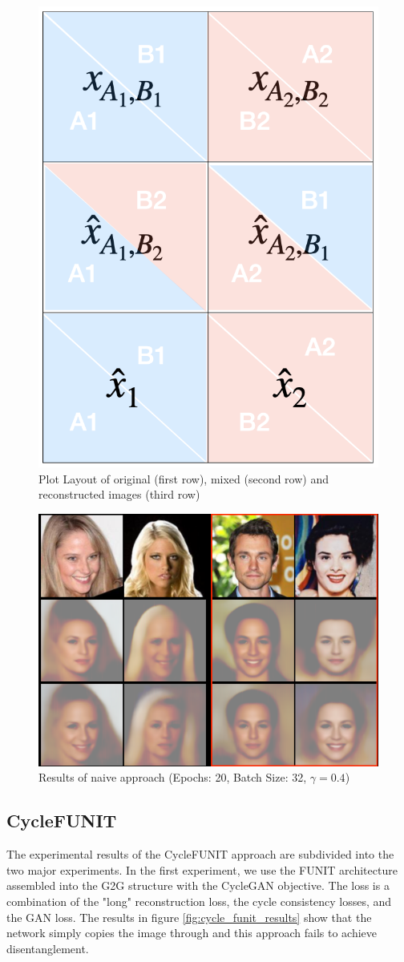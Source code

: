 \documentclass[conference]{IEEEtran}
\begin{document}
\begin{figure}[h!]
	\centering
	\includegraphics[width=0.5\linewidth]{figures/layout.png}
	\caption{Plot Layout of original (first row), mixed (second row) and reconstructed images (third row)}
	\label{fig:plot_layout}
\end{figure}

\begin{figure}[h!]
	\centering
	\includegraphics[width=\linewidth]{figures/naive_res.png}
	\caption{Results of naive approach (Epochs: 20, Batch Size: 32, $\gamma = 0.4$)}
	\label{fig:naive_results}
\end{figure}

\subsection{CycleFUNIT}
The experimental results of the CycleFUNIT approach are subdivided into the two major experiments. In the first experiment, we use the FUNIT architecture assembled into the G2G structure with the CycleGAN objective. The loss is a combination of the "long" reconstruction loss, the cycle consistency losses, and the GAN loss. The results in figure \ref{fig:cycle_funit_results} show that the network simply copies the image through and this approach fails to achieve disentanglement.
\end{document}
